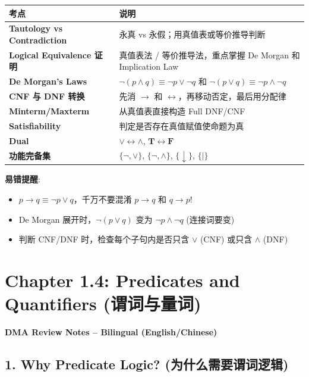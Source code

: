 \documentclass[10pt,a4paper,openany]{ctexbook}
\theoremstyle{definition}
\theoremstyle{remark}
\renewenvironment{quote}
  {\list{}{\leftmargin=1em\rightmargin=0pt\topsep=0.5pt\partopsep=0pt}\item[]}
  {\endlist}
\begin{document}
\begin{center}
\begin{tabular}{ll}
\hline
考点 & 说明 \\ \hline
\textbf{Tautology vs Contradiction} & 永真 vs 永假；用真值表或等价推导判断 \\
\textbf{Logical Equivalence 证明} & 真值表法 / 等价推导法，重点掌握 De Morgan 和 Implication Law \\
\textbf{De Morgan's Laws} & $\neg(p \land q) \equiv \neg p \lor \neg q$ 和 $\neg(p \lor q) \equiv \neg p \land \neg q$ \\
\textbf{CNF 与 DNF 转换} & 先消 $\to$ 和 $\leftrightarrow$，再移动否定，最后用分配律 \\
\textbf{Minterm/Maxterm} & 从真值表直接构造 Full DNF/CNF \\
\textbf{Satisfiability} & 判定是否存在真值赋值使命题为真 \\
\textbf{Dual} & $\lor \leftrightarrow \land$, $\mathbf{T} \leftrightarrow \mathbf{F}$ \\
\textbf{功能完备集} & $\{\neg,\lor\}$, $\{\neg,\land\}$, $\{\downarrow\}$, $\{\mid\}$ \\
\hline
\end{tabular}

\end{center}

\textbf{易错提醒}:
\begin{itemize}
\item $p \to q \equiv \neg p \lor q$，千万不要混淆 $p \to q$ 和 $q \to p$!
\item De Morgan 展开时，$\neg(p \lor q)$ 变为 $\neg p \land \neg q$ (连接词要变)
\item 判断 CNF/DNF 时，检查每个子句内是否只含 $\lor$ (CNF) 或只含 $\land$ (DNF)

\end{itemize}


\section{Chapter 1.4: Predicates and Quantifiers (谓词与量词)}

\begin{quote}
\textbf{DMA Review Notes -- Bilingual (English/Chinese)}

\end{quote}
\vspace{-2pt}

\subsection{1. Why Predicate Logic? (为什么需要谓词逻辑)}
\end{document}
